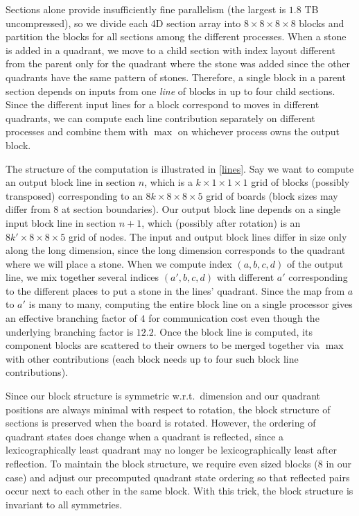 \documentclass[conference]{IEEEtran}
\newcommand{\wrt}{w.\thinspace r.\thinspace t.\ }
\begin{document}
Sections alone provide insufficiently fine parallelism (the largest is $1.8$ TB uncompressed), so we
divide each 4D section array into $8 \times 8 \times 8 \times 8$ blocks and partition the blocks for all
sections among the different processes.  When a stone is added in a quadrant, we move to a child section with
index layout different from the parent only for the quadrant where the stone was added
since the other quadrants have the same pattern of stones.  Therefore, a single block in a parent section depends
on inputs from one \emph{line} of blocks in up to four child sections.  Since the different input lines for a block
correspond to moves in different quadrants, we can compute each line contribution separately on different processes
and combine them with $\max$ on whichever process owns the output block.

The structure of the computation is illustrated in \autoref{lines}.  Say we want to compute an output block line
in section $n$, which is a $k \times 1 \times 1 \times 1$ grid of blocks (possibly transposed) corresponding to
an $8k \times 8 \times 8 \times 5$ grid of boards (block sizes may differ from $8$ at section boundaries).
Our output block line depends on a single input block line in section $n+1$, which (possibly after rotation) is an
$8k' \times 8 \times 8 \times 5$ grid of nodes.  The input and output block lines differ in size only along the
long dimension, since the long dimension corresponds to the quadrant where we will place a stone.  When we
compute index $(a,b,c,d)$ of the output line, we mix together several indices $(a',b,c,d)$ with different $a'$
corresponding to the different places to put a stone in the lines' quadrant.  Since the map from
$a$ to $a'$ is many to many, computing the entire block line on a single processor gives an effective
branching factor of $4$ for communication cost even though the underlying branching factor is $12.2$.
Once the block line is computed, its component blocks are scattered to their owners to be merged together
via $\max$ with other contributions (each block needs up to four such block line contributions).

Since our block structure is symmetric \wrt dimension and our quadrant positions are always minimal with respect
to rotation, the block structure of sections is preserved when the board is rotated.  However, the ordering of
quadrant states does change when a quadrant is reflected, since a lexicographically least quadrant may no longer
be lexicographically least after reflection.  To maintain the block structure, we require even sized blocks
(8 in our case) and adjust our precomputed quadrant state ordering so that reflected pairs occur next to each
other in the same block.  With this trick, the block structure is invariant to all symmetries.
\end{document}

